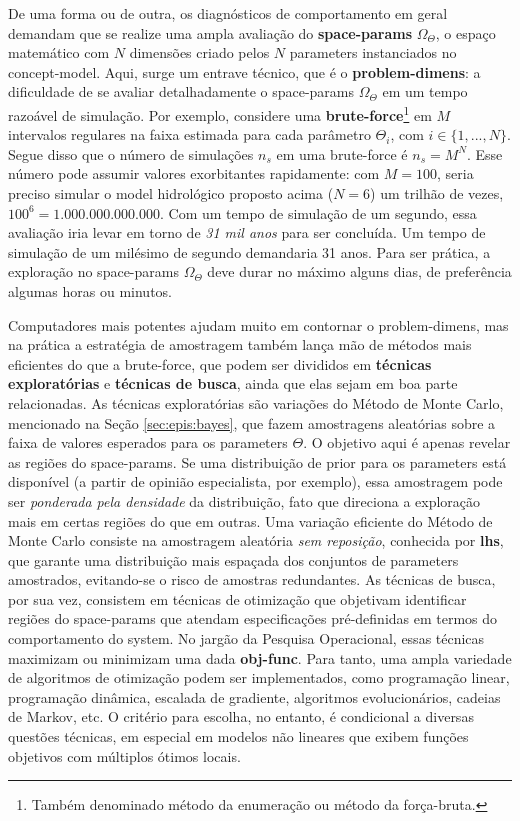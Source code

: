 \documentclass[./main.tex]{subfiles}
\begin{document}
\par De uma forma ou de outra, os diagnósticos de comportamento em geral demandam que se realize uma ampla avaliação do \textbf{\gls{space-params}} $\Omega_{\Theta}$, o espaço matemático com $N$ dimensões criado pelos $N$ \gls{parameters} instanciados no \gls{concept-model}. Aqui, surge um entrave técnico, que é o \textbf{\gls{problem-dimens}}: a dificuldade de se avaliar detalhadamente o \gls{space-params} $\Omega_{\Theta}$ em um tempo razoável de simulação. Por exemplo, considere uma \textbf{\gls{brute-force}}\footnote{Também denominado método da enumeração ou método da força-bruta.} em $M$ intervalos regulares na faixa estimada para cada parâmetro $\Theta_i$, com $i \in \{1, ..., N\}$. Segue disso que o número de simulações $n_s$ em uma \gls{brute-force} é $n_s = M^N$. Esse número pode assumir valores exorbitantes rapidamente: com $M=100$, seria preciso simular o \gls{model} hidrológico proposto acima ($N=6$) um trilhão de vezes, $100^6 = 1.000.000.000.000$. Com um tempo de simulação de um segundo, essa avaliação iria levar em torno de \textit{31 mil anos} para ser concluída. Um tempo de simulação de um milésimo de segundo demandaria 31 anos. Para ser prática, a exploração no \gls{space-params} $\Omega_{\Theta}$ deve durar no máximo alguns dias, de preferência algumas horas ou minutos. 

\par Computadores mais potentes ajudam muito em contornar o \gls{problem-dimens}, mas na prática a estratégia de amostragem também lança mão de métodos mais eficientes do que a \gls{brute-force}, que podem ser divididos em \textbf{técnicas exploratórias} e \textbf{técnicas de busca}, ainda que elas sejam em boa parte relacionadas. As técnicas exploratórias são variações do Método de Monte Carlo, mencionado na Seção \ref{sec:epis:bayes}, que fazem amostragens aleatórias sobre a faixa de valores esperados para os \gls{parameters} $\Theta$. O objetivo aqui é apenas revelar as regiões do \gls{space-params}. Se uma distribuição de \gls{prior} para os \gls{parameters} está disponível (a partir de opinião especialista, por exemplo), essa amostragem pode ser \textit{ponderada pela densidade} da distribuição, fato que direciona a exploração mais em certas regiões do que em outras. Uma variação eficiente do Método de Monte Carlo consiste na amostragem aleatória \textit{sem reposição}, conhecida por \textbf{\gls{lhs}}, que garante uma distribuição mais espaçada dos conjuntos de \gls{parameters} amostrados, evitando-se o risco de amostras redundantes. As técnicas de busca, por sua vez, consistem em técnicas de otimização que objetivam identificar regiões do \gls{space-params} que atendam especificações pré-definidas em termos do comportamento do \gls{system}. No jargão da Pesquisa Operacional, essas técnicas maximizam ou minimizam uma dada \textbf{\gls{obj-func}}. Para tanto, uma ampla variedade de algoritmos de otimização podem ser implementados, como programação linear, programação dinâmica, escalada de gradiente, algoritmos evolucionários, cadeias de Markov, etc. O critério para escolha, no entanto, é condicional a diversas questões técnicas, em especial em modelos não lineares que exibem funções objetivos com múltiplos ótimos locais.
\end{document}

